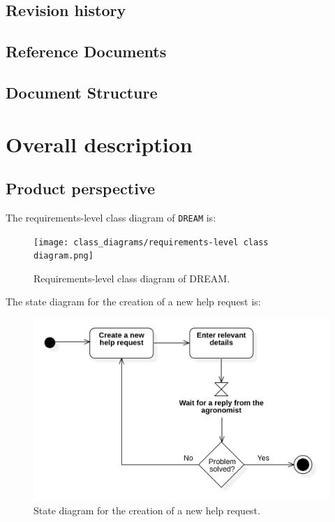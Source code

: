 \documentclass{article}
\begin{document}
\subsection{Revision history}
\subsection{Reference Documents}
\subsection{Document Structure}

\section{Overall description}
\subsection{Product perspective}
The requirements-level class diagram of \verb|DREAM| is:
\begin{figure}[H]
    \centering
	\texttt{[image: class\_diagrams/requirements-level class diagram.png]}
    \caption{Requirements-level class diagram of DREAM.}
\end{figure}

The state diagram for the creation of a new help request is:
\begin{figure}[H]
    \centering
	\includegraphics[scale=0.35]{state_machine_diagrams/statediagram1.png}
    \caption{State diagram for the creation of a new help request.}
\end{figure}
\end{document}
